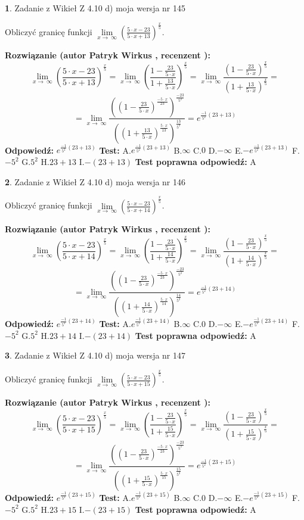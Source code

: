 \documentclass[12pt, a4paper]{article}
\theoremstyle{definition} %
\newtheorem{zad}{}
\newcommand{\zadStart}[1]{\begin{zad}#1\newline}
\newcommand{\zadStop}{\end{zad}}
\newcommand{\rozwStart}[2]{\noindent \textbf{Rozwiązanie (autor #1 , recenzent #2): }\newline}
\newcommand{\rozwStop}{\newline}
\newcommand{\odpStart}{\noindent \textbf{Odpowiedź:}\newline}
\newcommand{\odpStop}{\newline}
\newcommand{\testStart}{\noindent \textbf{Test:}\newline}
\newcommand{\testStop}{\newline}
\newcommand{\kluczStart}{\noindent \textbf{Test poprawna odpowiedź:}\newline}
\newcommand{\kluczStop}{\newline}
\begin{document}
\zadStart{Zadanie z Wikieł Z 4.10 d) moja wersja nr 145}


Obliczyć granicę funkcji  $\lim\limits_{x\to\ \infty}(\frac{5\cdot x-23}{5\cdot x+13})^{\frac{x}{5}}$.
\zadStop
\rozwStart{Patryk Wirkus}{}
$$\lim\limits_{x\to\ \infty}(\frac{5\cdot x-23}{5\cdot x+13})^{\frac{x}{5}} = \lim\limits_{x\to\ \infty}(\frac{1-\frac{23}{5\cdot x}}{1+\frac{13}{5\cdot x}})^{\frac{x}{5}}=\lim\limits_{x\to\ \infty}\frac{(1-\frac{23}{5\cdot x})^{\frac{x}{5}}}{(1+\frac{13}{5\cdot x})^{\frac{x}{5}}}=$$
$$=\lim\limits_{x\to\ \infty}\frac{((1-\frac{23}{5\cdot x})^{\frac{-5\cdot x}{23}})^{\frac{-23}{5^{2}}}}{((1+\frac{13}{5\cdot x})^{\frac{5\cdot x}{13}})^{\frac{13}{5^{2}}}}=e^{\frac{-1}{5^{2}}(23+13)}$$
\rozwStop
\odpStart
$e^{\frac{-1}{5^{2}}(23+13)}$
\odpStop
\testStart
A.$e^{\frac{-1}{5^{2}}(23+13)}$ B.$\infty$ C.$0$ D.$-\infty$ E.$-e^{\frac{-1}{5^{2}}(23+13)}$
F.$-5^{2}$ G.$5^{2}$
H.$23+13$
I.$-(23+13)$
\testStop
\kluczStart
A
\kluczStop



\zadStart{Zadanie z Wikieł Z 4.10 d) moja wersja nr 146}


Obliczyć granicę funkcji  $\lim\limits_{x\to\ \infty}(\frac{5\cdot x-23}{5\cdot x+14})^{\frac{x}{5}}$.
\zadStop
\rozwStart{Patryk Wirkus}{}
$$\lim\limits_{x\to\ \infty}(\frac{5\cdot x-23}{5\cdot x+14})^{\frac{x}{5}} = \lim\limits_{x\to\ \infty}(\frac{1-\frac{23}{5\cdot x}}{1+\frac{14}{5\cdot x}})^{\frac{x}{5}}=\lim\limits_{x\to\ \infty}\frac{(1-\frac{23}{5\cdot x})^{\frac{x}{5}}}{(1+\frac{14}{5\cdot x})^{\frac{x}{5}}}=$$
$$=\lim\limits_{x\to\ \infty}\frac{((1-\frac{23}{5\cdot x})^{\frac{-5\cdot x}{23}})^{\frac{-23}{5^{2}}}}{((1+\frac{14}{5\cdot x})^{\frac{5\cdot x}{14}})^{\frac{14}{5^{2}}}}=e^{\frac{-1}{5^{2}}(23+14)}$$
\rozwStop
\odpStart
$e^{\frac{-1}{5^{2}}(23+14)}$
\odpStop
\testStart
A.$e^{\frac{-1}{5^{2}}(23+14)}$ B.$\infty$ C.$0$ D.$-\infty$ E.$-e^{\frac{-1}{5^{2}}(23+14)}$
F.$-5^{2}$ G.$5^{2}$
H.$23+14$
I.$-(23+14)$
\testStop
\kluczStart
A
\kluczStop



\zadStart{Zadanie z Wikieł Z 4.10 d) moja wersja nr 147}


Obliczyć granicę funkcji  $\lim\limits_{x\to\ \infty}(\frac{5\cdot x-23}{5\cdot x+15})^{\frac{x}{5}}$.
\zadStop
\rozwStart{Patryk Wirkus}{}
$$\lim\limits_{x\to\ \infty}(\frac{5\cdot x-23}{5\cdot x+15})^{\frac{x}{5}} = \lim\limits_{x\to\ \infty}(\frac{1-\frac{23}{5\cdot x}}{1+\frac{15}{5\cdot x}})^{\frac{x}{5}}=\lim\limits_{x\to\ \infty}\frac{(1-\frac{23}{5\cdot x})^{\frac{x}{5}}}{(1+\frac{15}{5\cdot x})^{\frac{x}{5}}}=$$
$$=\lim\limits_{x\to\ \infty}\frac{((1-\frac{23}{5\cdot x})^{\frac{-5\cdot x}{23}})^{\frac{-23}{5^{2}}}}{((1+\frac{15}{5\cdot x})^{\frac{5\cdot x}{15}})^{\frac{15}{5^{2}}}}=e^{\frac{-1}{5^{2}}(23+15)}$$
\rozwStop
\odpStart
$e^{\frac{-1}{5^{2}}(23+15)}$
\odpStop
\testStart
A.$e^{\frac{-1}{5^{2}}(23+15)}$ B.$\infty$ C.$0$ D.$-\infty$ E.$-e^{\frac{-1}{5^{2}}(23+15)}$
F.$-5^{2}$ G.$5^{2}$
H.$23+15$
I.$-(23+15)$
\testStop
\kluczStart
A
\kluczStop
\end{document}

